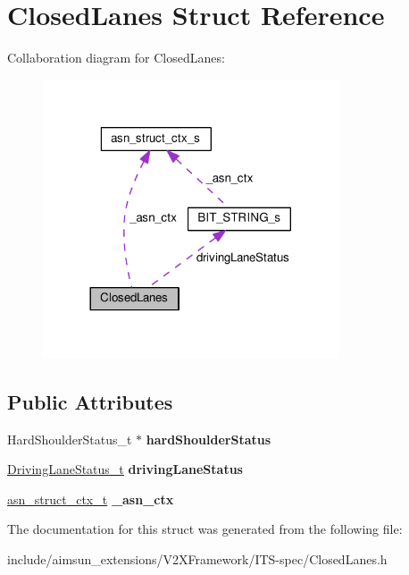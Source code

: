 \hypertarget{structClosedLanes}{}\section{Closed\+Lanes Struct Reference}
\label{structClosedLanes}


Collaboration diagram for Closed\+Lanes\+:\nopagebreak
\begin{figure}[H]
\begin{center}
\leavevmode
\includegraphics[width=248pt]{structClosedLanes__coll__graph}
\end{center}
\end{figure}
\subsection*{Public Attributes}
\begin{DoxyCompactItemize}
\item 
Hard\+Shoulder\+Status\+\_\+t $\ast$ {\bfseries hard\+Shoulder\+Status}\hypertarget{structClosedLanes_a20469a3710d76df3c7224573a75aeb2b}{}\label{structClosedLanes_a20469a3710d76df3c7224573a75aeb2b}

\item 
\hyperlink{structBIT__STRING__s}{Driving\+Lane\+Status\+\_\+t} {\bfseries driving\+Lane\+Status}\hypertarget{structClosedLanes_a057b7bc1606e75a52240a4b2b1505e1c}{}\label{structClosedLanes_a057b7bc1606e75a52240a4b2b1505e1c}

\item 
\hyperlink{structasn__struct__ctx__s}{asn\+\_\+struct\+\_\+ctx\+\_\+t} {\bfseries \+\_\+asn\+\_\+ctx}\hypertarget{structClosedLanes_a79b5fbe608d2500d26e17ee32b45c5a0}{}\label{structClosedLanes_a79b5fbe608d2500d26e17ee32b45c5a0}

\end{DoxyCompactItemize}


The documentation for this struct was generated from the following file\+:\begin{DoxyCompactItemize}
\item 
include/aimsun\+\_\+extensions/\+V2\+X\+Framework/\+I\+T\+S-\/spec/Closed\+Lanes.\+h\end{DoxyCompactItemize}
